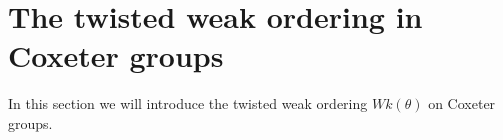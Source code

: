 \section{The twisted weak ordering in Coxeter groups}

In this section we will introduce the twisted weak ordering $Wk(\theta)$ on Coxeter groups. 